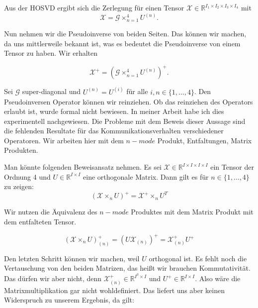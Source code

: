 Aus der HOSVD ergibt sich die Zerlegung für einen Tensor $\pmb{\mathscr{X}}  \in \mathbb{R}^{I_1 \times I_2 \times I_3 \times I_4}$  mit
\begin{equation}
\pmb{\mathscr{X}} = \pmb{\mathscr{G}} \times_{n=1}^{4} U^{ (n) }.
\end{equation}

Nun nehmen wir die Pseudoinverse von beiden Seiten. Das können wir machen, da uns mittlerweile bekannt ist, was es bedeutet die Pseudoinverse von einem Tensor zu haben. Wir erhalten

\begin{equation}
\pmb{\mathscr{X}}^{+} = (\pmb{\mathscr{G}} \times_{n=1}^{4} U^{ (n) })^+.
\end{equation}


Sei $\mathcal{G}$ super-diagonal und $U^{(n)}=U^{(i)}$ für alle $i,n \in \{1,\dots,4\}$. Den Pseudoinversen Operator können wir reinziehen. Ob das reinziehen des Operators erlaubt ist, wurde formal nicht bewiesen. In meiner Arbeit habe ich dies experimentell nachgewiesen. Die Probleme mit dem Beweis dieser Aussage sind die fehlenden Resultate für das Kommunikationsverhalten verschiedener Operatoren. Wir arbeiten hier mit dem $n-mode$ Produkt, Entfaltungen, Matrix Produkten. 

Man könnte folgenden Beweisansatz nehmen.
Es sei $\mathscr{X} \in \mathbb{R}^{I \times I \times I \times I}$ ein Tensor der Ordnung 4 und $U \in \mathbb{R}^{I \times I}$ eine orthogonale Matrix.
Dann gilt es für $n \in \{1,\dots,4\}$ zu zeigen:
\begin{equation*}
(\mathscr{X} \times_n U)^+ = \mathscr{X}^+ \times_n U^T 
\end{equation*} 

Wir nutzen die Äquivalenz des $n-mode$ Produktes mit dem Matrix Produkt mit dem entfalteten Tensor.

\begin{equation*}
(\mathscr{X} \times_n U)^+ _{(n)} = ( U \mathscr{X}_{(n)} )^+ = \mathscr{X}_{(n)}^+ U^+
\end{equation*}

Den letzten Schritt können wir machen, weil $U$ orthogonal ist.
Es fehlt noch die Vertauschung von den beiden Matrizen, das heißt wir brauchen Kommutativität.
Das dürfen wir aber nicht, denn $\mathscr{X}_{(n)}^+ \in \mathbb{R}^{I^3 \times I}$ und $U^+ \in \mathbb{R}^{I \times I}$. Also wäre die Matrixmultiplikation gar nicht wohldefiniert. Das liefert uns aber keinen Widerspruch zu unserem Ergebnis, da gilt:

